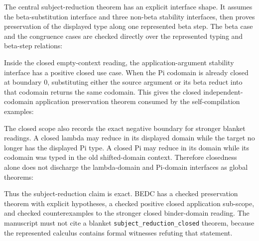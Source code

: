 The central subject-reduction theorem has an explicit interface shape.  It
assumes the beta-substitution interface and three non-beta stability
interfaces, then proves preservation of the displayed type along one
represented beta step.  The beta case and the congruence cases are checked
directly over the represented typing and beta-step relations:


Inside the closed empty-context reading, the application-argument stability
interface has a positive closed use case.  When the Pi codomain is already
closed at boundary $0$, substituting either the source argument or its beta
reduct into that codomain returns the same codomain.  This gives the closed
independent-codomain application preservation theorem consumed by the
self-compilation examples:


The closed scope also records the exact negative boundary for stronger
blanket readings.  A closed lambda may reduce in its displayed domain while
the target no longer has the displayed Pi type.  A closed Pi may reduce in
its domain while its codomain was typed in the old shifted-domain context.
Therefore closedness alone does not discharge the lambda-domain and Pi-domain
interfaces as global theorems:


Thus the subject-reduction claim is exact.  BEDC has a checked preservation
theorem with explicit hypotheses, a checked positive closed application
sub-scope, and checked counterexamples to the stronger closed binder-domain
reading.  The manuscript must not cite a blanket
\texttt{subject\_reduction\_closed} theorem, because the represented calculus
contains formal witnesses refuting that statement.

